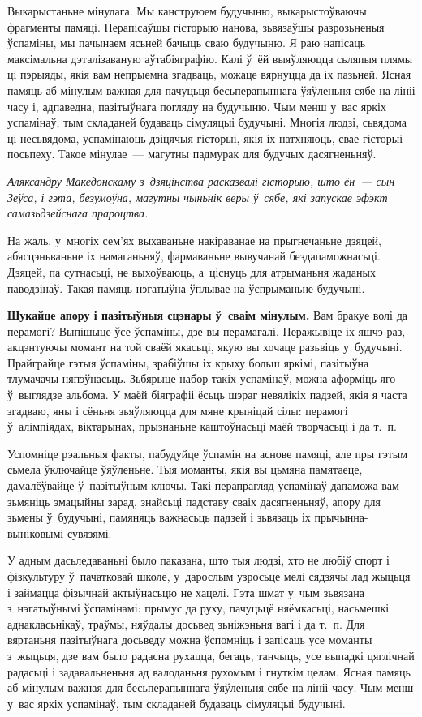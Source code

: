 Выкарыстаньне мінулага. Мы канструюем будучыню, выкарыстоўваючы фрагменты памяці. Перапісаўшы гісторыю нанова, зьвязаўшы разрозьненыя ўспаміны, мы пачынаем ясьней бачыць сваю будучыню. Я раю напісаць максімальна дэталізаваную аўтабіяграфію. Калі ў~ёй выяўляюцца сьляпыя плямы ці пэрыяды, якія вам непрыемна згадваць, можаце вярнуцца да іх пазьней. Ясная памяць аб мінулым важная для пачуцьця бесьперапыннага ўяўленьня сябе на лініі часу і, адпаведна, пазітыўнага погляду на будучыню. Чым менш у~вас яркіх успамінаў, тым складаней будаваць сімуляцыі будучыні. Многія людзі, сьвядома ці несьвядома, успамінаюць дзіцячыя гісторыі, якія іх натхняюць, свае гісторыі посьпеху. Такое мінулае~--- магутны падмурак для будучых дасягненьняў.

\emph{Аляксандру Македонскаму з~дзяцінства расказвалі гісторыю, што ён~--- сын Зеўса, і гэта, безумоўна, магутны чыньнік веры ў~сябе, які запускае эфэкт самазьдзейснага прароцтва.}

На жаль, у~многіх сем'ях выхаваньне накіраванае на прыгнечаньне дзяцей, абясцэньваньне іх намаганьняў, фармаваньне вывучанай бездапаможнасьці. Дзяцей, па сутнасьці, не выхоўваюць, а~ціснуць для атрыманьня жаданых паводзінаў. Такая памяць нэгатыўна ўплывае на ўспрыманьне будучыні.

\textbf{Шукайце апору і пазітыўныя сцэнары ў~сваім мінулым.} Вам бракуе волі да перамогі? Выпішыце ўсе ўспаміны, дзе вы перамагалі. Перажывіце іх яшчэ раз, акцэнтуючы момант на той сваёй якасьці, якую вы хочаце разьвіць у~будучыні. Прайграйце гэтыя ўспаміны, зрабіўшы іх крыху больш яркімі, пазітыўна тлумачачы няпэўнасьць. Зьбярыце набор такіх успамінаў, можна аформіць яго ў~выглядзе альбома. У маёй біяграфіі ёсьць шэраг невялікіх падзей, якія я часта згадваю, яны і сёньня зьяўляюцца для мяне крыніцай сілы: перамогі ў~алімпіядах, віктарынах, прызнаньне каштоўнасьці маёй творчасьці і да т.~п.

Успомніце рэальныя факты, пабудуйце ўспамін на аснове памяці, але пры гэтым сьмела ўключайце ўяўленьне. Тыя моманты, якія вы цьмяна памятаеце, дамалёўвайце ў~пазітыўным ключы. Такі перапрагляд успамінаў дапаможа вам зьмяніць эмацыйны зарад, знайсьці падставу сваіх дасягненьняў, апору для зьмены ў~будучыні, памяняць важнасьць падзей і зьвязаць іх прычынна-выніковымі сувязямі.


У адным дасьледаваньні было паказана, што тыя людзі, хто не любіў спорт і фізкультуру ў~пачатковай школе, у~дарослым узросьце мелі сядзячы лад жыцьця і займацца фізычнай актыўнасьцю не хацелі. Гэта шмат у~чым зьвязана з~нэгатыўнымі ўспамінамі: прымус да руху, пачуцьцё няёмкасьці, насьмешкі аднакласьнікаў, траўмы, няўдалы досьвед зьніжэньня вагі і да т.~п. Для вяртаньня пазітыўнага досьведу можна ўспомніць і запісаць усе моманты з~жыцьця, дзе вам было радасна рухацца, бегаць, танчыць, усе выпадкі цяглічнай радасьці і задавальненьня ад валоданьня рухомым і гнуткім целам. Ясная памяць аб мінулым важная для бесьперапыннага ўяўленьня сябе на лініі часу. Чым менш у~вас яркіх успамінаў, тым складаней будаваць сімуляцыі будучыні.


